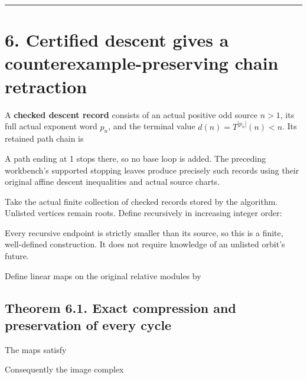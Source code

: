 \begin{center}\rule{0.5\linewidth}{0.5pt}\end{center}

\section{6. Certified descent gives a counterexample-preserving chain
retraction}

A \textbf{checked descent record} consists of an actual positive odd
source \(n>1\), its full actual exponent word \(p_n\), and the terminal
value \(d(n)=T^{|p_n|}(n)<n\). Its retained path chain is


A path ending at 1 stops there, so no base loop is added. The preceding
workbench's supported stopping leaves produce precisely such records
using their original affine descent inequalities and actual source
charts.

Take the actual finite collection of checked records stored by the
algorithm. Unlisted vertices remain roots. Define recursively in
increasing integer order:


Every recursive endpoint is strictly smaller than its source, so this is
a finite, well-defined construction. It does not require knowledge of an
unlisted orbit's future.

Define linear maps on the original relative modules by


\subsection{Theorem 6.1. Exact compression and preservation of every
cycle}

The maps satisfy


Consequently the image complex


